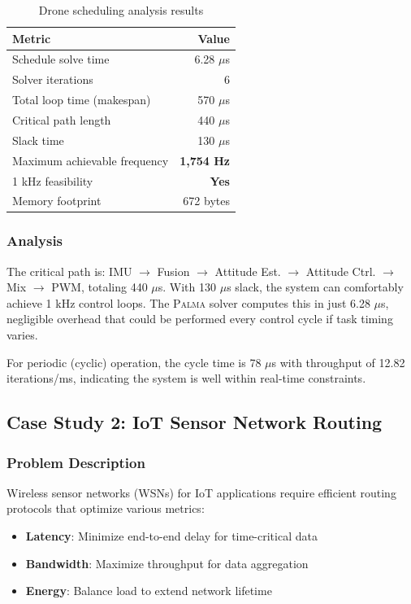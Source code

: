 \documentclass[11pt,a4paper]{article}
\theoremstyle{plain}
\theoremstyle{definition}
\newcommand{\palma}{\textsc{Palma}}
\begin{document}
\begin{table}[htbp]
\centering
\caption{Drone scheduling analysis results}
\label{tab:drone-results}
\begin{tabular}{lr}
\toprule
\textbf{Metric} & \textbf{Value} \\
\midrule
Schedule solve time & 6.28 $\mu$s \\
Solver iterations & 6 \\
Total loop time (makespan) & 570 $\mu$s \\
Critical path length & 440 $\mu$s \\
Slack time & 130 $\mu$s \\
Maximum achievable frequency & \textbf{1,754 Hz} \\
1 kHz feasibility & \textbf{Yes} \\
Memory footprint & 672 bytes \\
\bottomrule
\end{tabular}
\end{table}

\subsubsection{Analysis}

The critical path is: IMU $\to$ Fusion $\to$ Attitude Est. $\to$ Attitude Ctrl. $\to$ Mix $\to$ PWM, totaling 440 $\mu$s. With 130 $\mu$s slack, the system can comfortably achieve 1 kHz control loops. The \palma{} solver computes this in just 6.28 $\mu$s, negligible overhead that could be performed every control cycle if task timing varies.

For periodic (cyclic) operation, the cycle time is 78 $\mu$s with throughput of 12.82 iterations/ms, indicating the system is well within real-time constraints.

\subsection{Case Study 2: IoT Sensor Network Routing}

\subsubsection{Problem Description}

Wireless sensor networks (WSNs) for IoT applications require efficient routing protocols that optimize various metrics:
\begin{itemize}
    \item \textbf{Latency}: Minimize end-to-end delay for time-critical data
    \item \textbf{Bandwidth}: Maximize throughput for data aggregation
    \item \textbf{Energy}: Balance load to extend network lifetime
\end{itemize}
\end{document}
